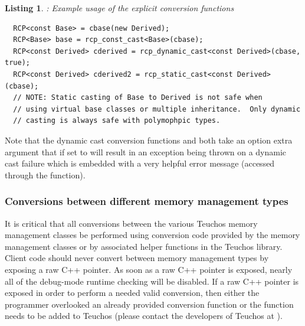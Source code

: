 \documentclass[pdf,ps2pdf,11pt]{SANDreport}
\newtheorem{listing}{Listing}
\begin{document}
{}\begin{listing}: Example usage of the explicit conversion functions
\label{listing:conversions-examples}
{\small\begin{verbatim}
  RCP<const Base> = cbase(new Derived);
  RCP<Base> base = rcp_const_cast<Base>(cbase);
  RCP<const Derived> cderived = rcp_dynamic_cast<const Derived>(cbase, true);
  RCP<const Derived> cderived2 = rcp_static_cast<const Derived>(cbase);
  // NOTE: Static casting of Base to Derived is not safe when
  // using virtual base classes or multiple inheritance.  Only dynamic
  // casting is always safe with polymophpic types.
\end{verbatim}}
\end{listing}


Note that the dynamic cast conversion functions
{} and {} both
take an option extra argument {} that if set to
{} will result in an exception being thrown on a dynamic
cast failure which is embedded with a very helpful error message
(accessed through the {} function).


%
{}\subsubsection{Conversions between different memory management types}
\label{sec:teuchos-type-conversions}
%

It is critical that all conversions between the various Teuchos memory
management classes be performed using conversion code provided by the
memory management classes or by associated helper functions in the
Teuchos library.  Client code should never convert between memory
management types by exposing a raw C++ pointer.  As soon as a raw C++
pointer is exposed, nearly all of the debug-mode runtime checking will
be disabled.  If a raw C++ pointer is exposed in order to perform a
needed valid conversion, then either the programmer overlooked an
already provided conversion function or the function needs to be added
to Teuchos (please contact the developers of Teuchos at
{}).
\end{document}
